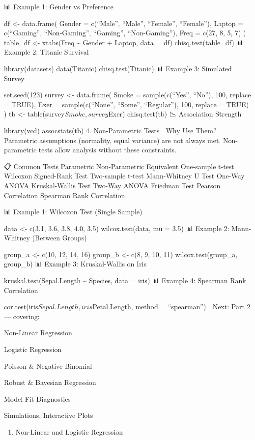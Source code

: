 \documentclass[
  letterpaper,
  DIV=11,
  numbers=noendperiod]{scrreprt}
\providecommand{\tightlist}{%
  \setlength{\itemsep}{0pt}\setlength{\parskip}{0pt}}
\begin{document}
📊 Example 1: Gender vs Preference

df \textless- data.frame( Gender = c(``Male'', ``Male'', ``Female'',
``Female''), Laptop = c(``Gaming'', ``Non-Gaming'', ``Gaming'',
``Non-Gaming''), Freq = c(27, 8, 5, 7) ) table\_df \textless- xtabs(Freq
\textasciitilde{} Gender + Laptop, data = df) chisq.test(table\_df) 📊
Example 2: Titanic Survival

library(datasets) data(Titanic) chisq.test(Titanic) 📊 Example 3:
Simulated Survey

set.seed(123) survey \textless- data.frame( Smoke = sample(c(``Yes'',
``No''), 100, replace = TRUE), Exer = sample(c(``None'', ``Some'',
``Regular''), 100, replace = TRUE) ) tb \textless-
table(survey\(Smoke, survey\)Exer) chisq.test(tb) 📉 Association
Strength

library(vcd) assocstats(tb) 4. Non-Parametric Tests 🎯 Why Use Them?
Parametric assumptions (normality, equal variance) are not always met.
Non-parametric tests allow analysis without these constraints.

📋 Common Tests Parametric Non-Parametric Equivalent One-sample t-test
Wilcoxon Signed-Rank Test Two-sample t-test Mann-Whitney U Test One-Way
ANOVA Kruskal-Wallis Test Two-Way ANOVA Friedman Test Pearson
Correlation Spearman Rank Correlation

📊 Example 1: Wilcoxon Test (Single Sample)

data \textless- c(3.1, 3.6, 3.8, 4.0, 3.5) wilcox.test(data, mu = 3.5)
📊 Example 2: Mann-Whitney (Between Groups)

group\_a \textless- c(10, 12, 14, 16) group\_b \textless- c(8, 9, 10,
11) wilcox.test(group\_a, group\_b) 📊 Example 3: Kruskal-Wallis on Iris

kruskal.test(Sepal.Length \textasciitilde{} Species, data = iris) 📊
Example 4: Spearman Rank Correlation

cor.test(iris\(Sepal.Length, iris\)Petal.Length, method = ``spearman'')
🚧 Next: Part 2 --- covering:

Non-Linear Regression

Logistic Regression

Poisson \& Negative Binomial

Robust \& Bayesian Regression

Model Fit Diagnostics

Simulations, Interactive Plots

\begin{enumerate}
\def\labelenumi{\arabic{enumi}.}
\setcounter{enumi}{4}
\tightlist
\item
  Non-Linear and Logistic Regression
\end{enumerate}
\end{document}
